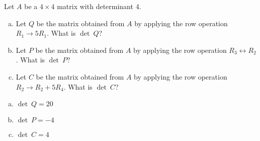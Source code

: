 
\begin{exerciseStatement}


Let \(A\) be a \(4 \times 4\) matrix with determinant \( 4 \).


\begin{enumerate}[(a)]
\item Let \(Q\) be the matrix obtained from \(A\) by applying the row operation \( R_1 \to 5R_1 \). What is \(\operatorname{det}\ Q\)?
\item Let \(P\) be the matrix obtained from \(A\) by applying the row operation \( R_3 \leftrightarrow R_2 \). What is \(\operatorname{det}\ P\)?
\item Let \(C\) be the matrix obtained from \(A\) by applying the row operation \( R_2 \to R_2 + 5R_4 \). What is \(\operatorname{det}\ C\)?
\end{enumerate}
    
\end{exerciseStatement}
    
\begin{exerciseAnswer} 

\begin{enumerate}[(a)]
\item \(\operatorname{det}\ Q= 20 \)
\item \(\operatorname{det}\ P= -4 \)
\item \(\operatorname{det}\ C= 4 \)
\end{enumerate}
    
\end{exerciseAnswer}
    
